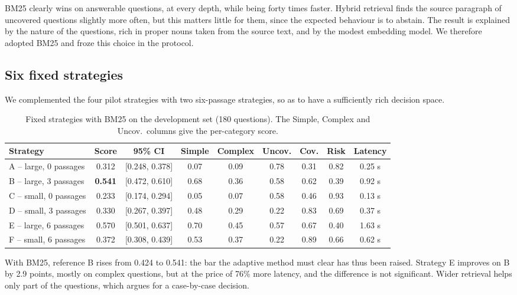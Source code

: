 \documentclass[11pt,a4paper]{article}
\begin{document}
BM25 clearly wins on answerable questions, at every depth, while being forty times faster. Hybrid
retrieval finds the source paragraph of uncovered questions slightly more often, but this matters little
for them, since the expected behaviour is to abstain. The result is explained by the nature of the
questions, rich in proper nouns taken from the source text, and by the modest embedding model. We
therefore adopted BM25 and froze this choice in the protocol.

\subsection{Six fixed strategies}

We complemented the four pilot strategies with two six-passage strategies, so as to have a sufficiently
rich decision space.

\begin{table}[H]
\centering\footnotesize\setlength{\tabcolsep}{4pt}
\begin{tabular}{l c c c c c c c c}
\toprule
\textbf{Strategy} & \textbf{Score} & \textbf{95\% CI} & \textbf{Simple} & \textbf{Complex} & \textbf{Uncov.} & \textbf{Cov.} & \textbf{Risk} & \textbf{Latency} \\
\midrule
A -- large, 0 passages   & 0.312 & [0.248, 0.378] & 0.07 & 0.09 & 0.78 & 0.31 & 0.82 & 0.25 s \\
B -- large, 3 passages  & \textbf{0.541} & [0.472, 0.610] & 0.68 & 0.36 & 0.58 & 0.62 & 0.39 & 0.92 s \\
C -- small, 0 passages   & 0.233 & [0.174, 0.294] & 0.05 & 0.07 & 0.58 & 0.46 & 0.93 & 0.13 s \\
D -- small, 3 passages  & 0.330 & [0.267, 0.397] & 0.48 & 0.29 & 0.22 & 0.83 & 0.69 & 0.37 s \\
E -- large, 6 passages  & 0.570 & [0.501, 0.637] & 0.70 & 0.45 & 0.57 & 0.67 & 0.40 & 1.63 s \\
F -- small, 6 passages  & 0.372 & [0.308, 0.439] & 0.53 & 0.37 & 0.22 & 0.89 & 0.66 & 0.62 s \\
\bottomrule
\end{tabular}
\caption{Fixed strategies with BM25 on the development set (180 questions). The Simple, Complex and
Uncov.\ columns give the per-category score.}
\label{tab:strategies}
\end{table}

With BM25, reference B rises from 0.424 to 0.541: the bar the adaptive method must clear has thus been
raised. Strategy E improves on B by 2.9 points, mostly on complex questions, but at the price of 76\%
more latency, and the difference is not significant. Wider retrieval helps only part of the questions,
which argues for a case-by-case decision.
\end{document}
